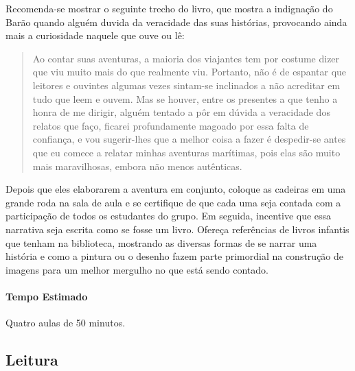 \documentclass[11pt]{extarticle}
\begin{document}

Recomenda-se mostrar o seguinte trecho do livro, que mostra a indignação do Barão quando alguém duvida da veracidade das suas histórias, provocando ainda mais a curiosidade naquele que ouve ou lê:

\begin{quote}

Ao contar suas aventuras, a maioria dos viajantes tem por costume dizer que viu muito mais do que realmente viu. Portanto, não é de espantar que leitores e ouvintes algumas vezes sintam-se inclinados a não acreditar em tudo que leem e ouvem. Mas se houver, entre os presentes a que tenho a honra de me dirigir, alguém tentado a pôr em dúvida a veracidade dos relatos que faço, ficarei profundamente magoado por essa falta de confiança, e vou sugerir-lhes que a melhor coisa a fazer é despedir-se antes que eu comece a relatar minhas aventuras marítimas, pois elas são muito mais maravilhosas, embora não menos autênticas.

\end{quote}

Depois que eles elaborarem a aventura em conjunto, coloque as cadeiras em uma grande roda na sala de aula e se certifique de que cada uma seja contada com a participação de todos os estudantes do grupo. Em seguida, incentive que essa narrativa seja escrita como se fosse um livro. Ofereça referências de livros infantis que tenham na biblioteca, mostrando as diversas formas de se narrar uma história e como a pintura ou o desenho fazem parte primordial na construção de imagens para um melhor mergulho no que está sendo contado. 


\paragraph{Tempo Estimado} Quatro aulas de 50 minutos. 

\subsection{Leitura}
\end{document}
